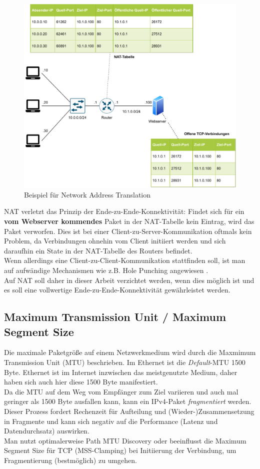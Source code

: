 \begin{figure}[h]
  \centering
  \includegraphics[scale=0.90]{Figures/napt.pdf}
  \caption{Beispiel für Network Address Translation}
  \label{grafik: napt}
\end{figure}\FloatBarrier

NAT\label{nat-bad} verletzt das Prinzip der Ende-zu-Ende-Konnektivität: Findet sich für ein \textbf{vom Webserver kommendes} Paket in der NAT-Tabelle kein Eintrag, wird das Paket verworfen. Dies ist bei einer Client-zu-Server-Kommunikation oftmals kein Problem, da Verbindungen ohnehin vom Client initiiert werden und sich daraufhin ein State in der NAT-Tabelle des Routers befindet.\\
Wenn allerdings eine Client-zu-Client-Kommunikation stattfinden soll, ist man auf aufwändige Mechanismen wie z.B. Hole Punching angewiesen \cite[S.317]{Fall2011}.\\
Auf NAT soll daher in dieser Arbeit verzichtet werden, wenn dies möglich ist und es soll eine vollwertige Ende-zu-Ende-Konnektivität gewährleistet werden.

\subsection{Maximum Transmission Unit / Maximum Segment Size}\label{mtumss}
Die maximale Paketgröße auf einem Netzwerkmedium wird durch die Maxmimum Transmission Unit (MTU) beschrieben. Im Ethernet ist die \textit{Default}-MTU 1500 Byte.\cite[S.86]{Fall2011} Ethernet ist im Internet inzwischen das meistgenutzte Medium, daher haben sich auch hier diese 1500 Byte manifestiert.\\
Da die MTU auf dem Weg vom Empfänger zum Ziel variieren und auch mal geringer als 1500 Byte ausfallen kann, kann ein IPv4-Paket \textit{fragmentiert} werden. Dieser Prozess fordert Rechenzeit für Aufteilung und (Wieder-)Zusammensetzung in Fragmente und kann sich negativ auf die Performance (Latenz und Datendurchsatz) auswirken.\\
Man nutzt optimalerweise Path MTU Discovery oder beeinflusst die Maximum Segment Size für TCP (\glqq MSS-Clamping\grqq{}) bei Initiierung der Verbindung, um Fragmentierung (bestmöglich) zu umgehen.

